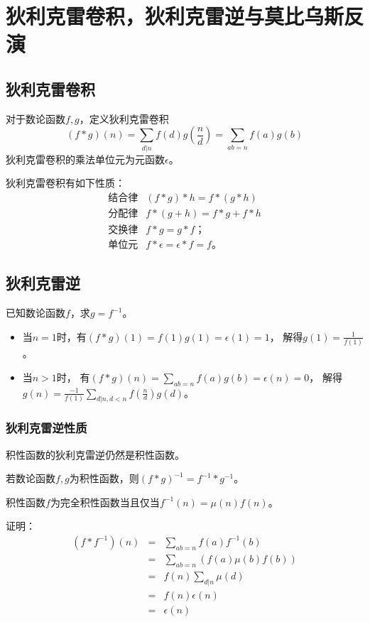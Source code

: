 \section{狄利克雷卷积，狄利克雷逆与莫比乌斯反演}
\subsection{狄利克雷卷积}
对于数论函数$f,g$，定义狄利克雷卷积
\begin{displaymath}
	(f*g)(n)=\sum_{d|n}{f(d)g(\frac{n}{d})}=\sum_{ab=n}{f(a)g(b)}
\end{displaymath}
狄利克雷卷积的乘法单位元为元函数$\epsilon$。

狄利克雷卷积有如下性质：
\begin{eqnarray*}
	\textrm{结合律} & (f*g)*h=f*(g*h)\\
	\textrm{分配律} & f*(g+h)=f*g+f*h\\
	\textrm{交换律} & f*g=g*f；\\
	\textrm{单位元} & f*\epsilon=\epsilon*f=f。
\end{eqnarray*}
\subsection{狄利克雷逆}
已知数论函数$f$，求$g=f^{-1}$。
\begin{itemize}
	\item 当$n=1$时，有$(f*g)(1)=f(1)g(1)=\epsilon(1)=1$，
	      解得$g(1)=\frac{1}{f(1)}$。
	\item 当$n>1$时，
	      有$\displaystyle (f*g)(n)=\sum_{ab=n}{f(a)g(b)}=\epsilon(n)=0$，
	      解得$\displaystyle g(n)=\frac{-1}{f(1)}
		      \sum_{d|n,d<n}{f(\frac{n}{d})g(d)}$。
\end{itemize}
\subsubsection{狄利克雷逆性质}
\begin{property}
	积性函数的狄利克雷逆仍然是积性函数。
\end{property}
\begin{property}
	若数论函数$f,g$为积性函数，则$(f*g)^{-1}=f^{-1}*g^{-1}$。
\end{property}
\begin{property}
	积性函数$f$为完全积性函数当且仅当$f^{-1}(n)=\mu(n)f(n)$。
\end{property}
证明：\begin{eqnarray*}
	(f*f^{-1})(n)&=&\sum_{ab=n}{f(a)f^{-1}(b)}\\
	&=&\sum_{ab=n}(f(a)\mu(b)f(b))\\
	&=&f(n)\sum_{d|n}{\mu(d)}\\
	&=&f(n)\epsilon(n)\\
	&=&\epsilon(n)
\end{eqnarray*}

